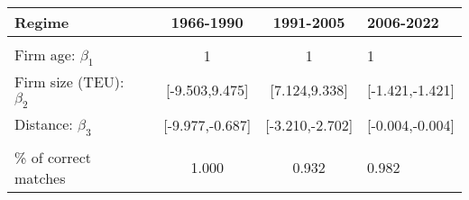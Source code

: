 
\begin{tabular}[t]{lcccl}
\toprule
Regime &  & 1966-1990 & 1991-2005 & 2006-2022\\
\midrule
 &  &  &  \vphantom{1} & \\
Firm age: $\beta_1$ &  & 1 & 1 & 1\\
Firm size (TEU): $\beta_2$ &  & {}[-9.503,9.475] & {}[7.124,9.338] & {}[-1.421,-1.421]\\
Distance: $\beta_3$ &  & {}[-9.977,-0.687] & {}[-3.210,-2.702] & {}[-0.004,-0.004]\\
 &  &  &  & \\
\% of correct matches &  & 1.000 & 0.932 & 0.982\\
\bottomrule
\end{tabular}
